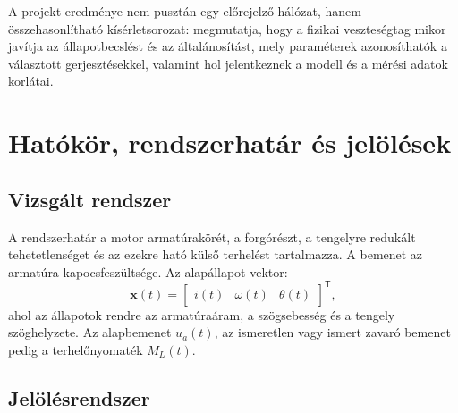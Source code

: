\documentclass[11pt,a4paper]{article}
\newcommand{\vect}[1]{\boldsymbol{#1}}
\begin{document}
A projekt eredménye nem pusztán egy előrejelző hálózat, hanem összehasonlítható kísérletsorozat: megmutatja, hogy a fizikai veszteségtag mikor javítja az állapotbecslést és az általánosítást, mely paraméterek azonosíthatók a választott gerjesztésekkel, valamint hol jelentkeznek a modell és a mérési adatok korlátai.

\section{Hatókör, rendszerhatár és jelölések}

\subsection{Vizsgált rendszer}

A rendszerhatár a motor armatúrakörét, a forgórészt, a tengelyre redukált tehetetlenséget és az ezekre ható külső terhelést tartalmazza. A bemenet az armatúra kapocsfeszültsége. Az alapállapot-vektor:
\begin{equation}
  \vect{x}(t)=
  \begin{bmatrix}
    i(t) & \omega(t) & \theta(t)
  \end{bmatrix}^{\mathsf T},
  \label{eq:state}
\end{equation}
ahol az állapotok rendre az armatúraáram, a szögsebesség és a tengely szöghelyzete. Az alapbemenet $u_a(t)$, az ismeretlen vagy ismert zavaró bemenet pedig a terhelőnyomaték $M_L(t)$.

\subsection{Jelölésrendszer}
\end{document}
